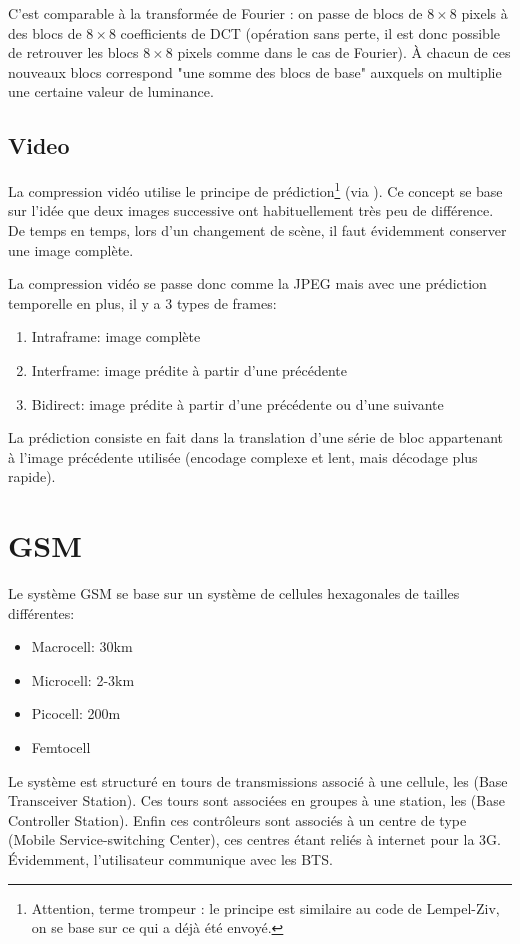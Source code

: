 C'est comparable à la transformée de Fourier : on passe de blocs de $8 \times 8$ pixels à des blocs de $8 \times 8$ coefficients de DCT (opération sans perte, il est donc possible de retrouver les blocs $8 \times 8$ pixels comme dans le cas de Fourier). À chacun de ces nouveaux blocs correspond "une somme des blocs de base" auxquels on multiplie une certaine valeur de luminance.

\section{Video}

La compression vidéo utilise le principe de prédiction\footnote{Attention, terme trompeur : le principe est similaire au code de Lempel-Ziv, on se base sur ce qui a déjà été envoyé.} (via ).
Ce concept se base sur l'idée que deux images successive ont habituellement très peu de différence. De temps en temps, lors d'un changement de scène, il faut évidemment conserver une image complète.

La compression vidéo se passe donc comme la JPEG mais avec une prédiction temporelle en plus, il y a 3 types de frames:
\begin{enumerate}
\item Intraframe: image complète
\item Interframe: image prédite à partir d'une précédente
\item Bidirect: image prédite à partir d'une précédente ou d'une suivante
\end{enumerate}
La prédiction consiste en fait dans la translation d'une série de bloc appartenant à l'image précédente utilisée (encodage complexe et lent, mais décodage plus rapide).

\chapter{GSM}

Le système GSM se base sur un système de cellules hexagonales de
tailles différentes:
\begin{itemize}
	\item Macrocell: 30km
	\item Microcell: 2-3km
	\item Picocell: 200m
	\item Femtocell
\end{itemize}

Le système est structuré en tours de transmissions associé à une cellule, les  (Base Transceiver Station). Ces tours sont associées en groupes à une station, les  (Base Controller Station). Enfin ces contrôleurs sont associés à un centre de type  (Mobile Service-switching Center), ces centres étant reliés à internet pour la 3G. Évidemment, l'utilisateur communique avec les BTS.

